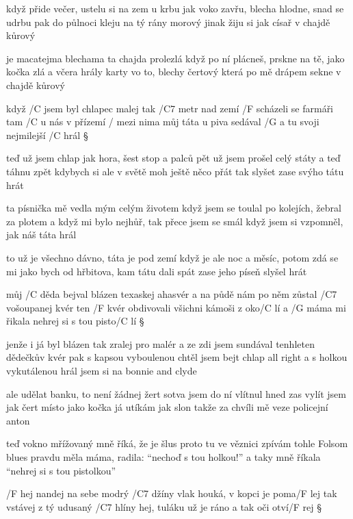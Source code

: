 když přide večer, ustelu si na zem u krbu
jak voko zavřu, blecha hlodne, snad se udrbu
pak do půlnoci kleju na tý rány morový
jinak žiju si jak císař v chajdě kůrový \s

je macatejma blechama ta chajda prolezlá
když po ní plácneš, prskne na tě, jako kočka zlá
a včera hrály karty vo to, blechy čertový
která po mě drápem sekne v chajdě kůrový




když /C jsem byl chlapec malej tak /C7 metr nad zemí
/F scházeli se farmáři tam /C u nás v přízemí
/ mezi nima můj táta u piva sedával
/G a tu svoji nejmilejší /C hrál \S

teď už jsem chlap jak hora, šest stop a palců pět
už jsem prošel celý státy a teď táhnu zpět
kdybych si ale v světě moh ještě něco přát
tak slyšet zase svýho tátu hrát \s

ta písnička mě vedla mým celým životem
když jsem se toulal po kolejích, žebral za plotem
a když mi bylo nejhůř, tak přece jsem se smál
když jsem si vzpomněl, jak náš táta hrál \s

to už je všechno dávno, táta je pod zemí
když je ale noc a měsíc, potom zdá se mi
jako bych od hřbitova, kam tátu dali spát
zase jeho píseň slyšel hrát \s




můj /C děda bejval blázen texaskej ahasvér
a na půdě nám po něm zůstal /C7 vošoupanej kvér
ten /F kvér obdivovali všichni kámoši z oko/C lí
a /G máma mi řikala nehrej si s tou pisto/C lí \S

jenže i já byl blázen tak zralej pro malér
a ze zdi jsem sundával tenhleten dědečkův kvér
pak s kapsou vyboulenou chtěl jsem bejt chlap all right
a s holkou vykutálenou hrál jsem si na bonnie and clyde \s

ale udělat banku, to není žádnej žert
sotva jsem do ní vlítnul hned zas vylít jsem jak čert
místo jako kočka já utíkám jak slon
takže za chvíli mě veze policejní anton \songgg

teď vokno mřížovaný mně říká, že je šlus
proto tu ve věznici zpívám tohle Folsom blues
pravdu měla máma, radila: ``nechoď s tou holkou!''
a taky mně říkala ``nehrej si s tou pistolkou''




/F hej nandej na sebe modrý /C7 džíny
vlak houká, v kopci je poma/F lej
tak vstávej z tý udusaný /C7 hlíny
hej, tuláku už je ráno a tak oči otví/F rej \S

